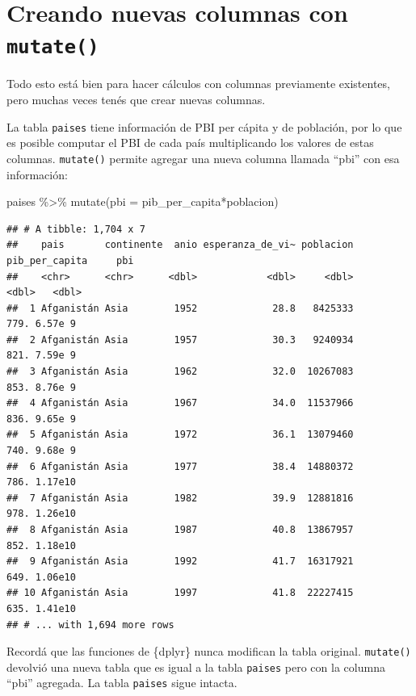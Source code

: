 \documentclass[
  openany]{book}
\newenvironment{Shaded}{\begin{snugshade}}{\end{snugshade}}
\newcommand{\AttributeTok}[1]{\textcolor[rgb]{0.77,0.63,0.00}{#1}}
\newcommand{\FunctionTok}[1]{\textcolor[rgb]{0.00,0.00,0.00}{#1}}
\newcommand{\NormalTok}[1]{#1}
\newcommand{\SpecialCharTok}[1]{\textcolor[rgb]{0.00,0.00,0.00}{#1}}
\begin{document}
\hypertarget{creando-nuevas-columnas-con-mutate}{%
\section{\texorpdfstring{Creando nuevas columnas con \texttt{mutate()}}{Creando nuevas columnas con mutate()}}\label{creando-nuevas-columnas-con-mutate}}

Todo esto está bien para hacer cálculos con columnas previamente existentes, pero muchas veces tenés que crear nuevas columnas.

La tabla \texttt{paises} tiene información de PBI per cápita y de población, por lo que es posible computar el PBI de cada país multiplicando los valores de estas columnas.
\texttt{mutate()} permite agregar una nueva columna llamada ``pbi'' con esa información:

\begin{Shaded}
\begin{Highlighting}[]
\NormalTok{paises }\SpecialCharTok{\%\textgreater{}\%} 
  \FunctionTok{mutate}\NormalTok{(}\AttributeTok{pbi =}\NormalTok{ pib\_per\_capita}\SpecialCharTok{*}\NormalTok{poblacion)}
\end{Highlighting}
\end{Shaded}

\begin{verbatim}
## # A tibble: 1,704 x 7
##    pais       continente  anio esperanza_de_vi~ poblacion pib_per_capita     pbi
##    <chr>      <chr>      <dbl>            <dbl>     <dbl>          <dbl>   <dbl>
##  1 Afganistán Asia        1952             28.8   8425333           779. 6.57e 9
##  2 Afganistán Asia        1957             30.3   9240934           821. 7.59e 9
##  3 Afganistán Asia        1962             32.0  10267083           853. 8.76e 9
##  4 Afganistán Asia        1967             34.0  11537966           836. 9.65e 9
##  5 Afganistán Asia        1972             36.1  13079460           740. 9.68e 9
##  6 Afganistán Asia        1977             38.4  14880372           786. 1.17e10
##  7 Afganistán Asia        1982             39.9  12881816           978. 1.26e10
##  8 Afganistán Asia        1987             40.8  13867957           852. 1.18e10
##  9 Afganistán Asia        1992             41.7  16317921           649. 1.06e10
## 10 Afganistán Asia        1997             41.8  22227415           635. 1.41e10
## # ... with 1,694 more rows
\end{verbatim}

Recordá que las funciones de \{dplyr\} nunca modifican la tabla original.
\texttt{mutate()} devolvió una nueva tabla que es igual a la tabla \texttt{paises} pero con la columna ``pbi'' agregada.
La tabla \texttt{paises} sigue intacta.
\end{document}
